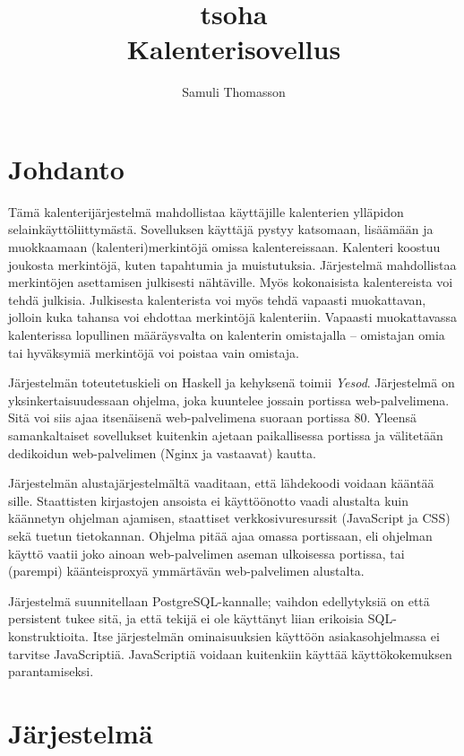 \documentclass[a4paper,12pt]{report}
\title{tsoha\\Kalenterisovellus}
\author{Samuli Thomasson}
\begin{document}

\maketitle
\tableofcontents
\chapter{Johdanto}
Tämä kalenterijärjestelmä mahdollistaa käyttäjille kalenterien ylläpidon
selain\-käyttö\-liittymästä.  Sovelluksen käyttäjä pystyy katsomaan, lisäämään
ja muokkaamaan (kalenteri)merkintöjä omissa kalentereissaan.  Kalenteri koostuu
joukosta merkintöjä, kuten tapahtumia ja muistutuksia.  Järjestelmä mahdollistaa
merkintöjen asettamisen julkisesti nähtäville. Myös kokonaisista kalentereista
voi tehdä julkisia. Julkisesta kalenterista voi myös tehdä vapaasti muokattavan,
jolloin kuka tahansa voi ehdottaa merkintöjä kalenteriin. Vapaasti muokattavassa
kalenterissa lopullinen määräysvalta on kalenterin omistajalla -- omistajan omia
tai hyväksymiä merkintöjä voi poistaa vain omistaja.

Järjestelmän toteutetuskieli on Haskell ja kehyksenä toimii \emph{Yesod}.
Järjestelmä on yksinkertaisuudessaan ohjelma, joka kuuntelee jossain portissa
web-palvelimena. Sitä voi siis ajaa itsenäisenä web-palvelimena suoraan portissa
80. Yleensä samankaltaiset sovellukset kuitenkin ajetaan paikallisessa portissa
ja välitetään dedikoidun web-palvelimen (Nginx ja vastaavat) kautta.

Järjestelmän alustajärjestelmältä vaaditaan, että lähdekoodi voidaan kääntää
sille. Staattisten kirjastojen ansoista ei käyttöönotto vaadi alustalta kuin
käännetyn ohjelman ajamisen, staattiset verkkosivuresurssit (JavaScript ja CSS)
sekä tuetun tietokannan. Ohjelma pitää ajaa omassa portissaan, eli ohjelman
käyttö vaatii joko ainoan web-palvelimen aseman ulkoisessa portissa, tai
(parempi) käänteisproxyä ymmärtävän web-palvelimen alustalta.

Järjestelmä suunnitellaan PostgreSQL-kannalle; vaihdon edellytyksiä on että
persistent tukee sitä, ja että tekijä ei ole käyttänyt liian erikoisia
SQL-konstruktioita.  Itse järjestelmän ominaisuuksien käyttöön asiakasohjelmassa
ei tarvitse JavaScriptiä. JavaScriptiä voidaan kuitenkiin käyttää
käyttökokemuksen parantamiseksi.

\chapter{Järjestelmä}
\end{document}
